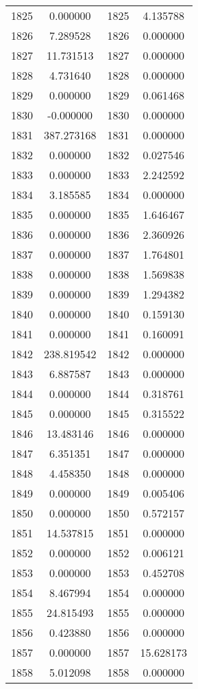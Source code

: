\documentclass[12pt]{article}
\begin{document}
\begin{longtable}{@{}cccc@{}}
1825 & 0.000000 & 1825 & 4.135788 \\
1826 & 7.289528 & 1826 & 0.000000 \\
1827 & 11.731513 & 1827 & 0.000000 \\
1828 & 4.731640 & 1828 & 0.000000 \\
1829 & 0.000000 & 1829 & 0.061468 \\
1830 & -0.000000 & 1830 & 0.000000 \\
1831 & 387.273168 & 1831 & 0.000000 \\
1832 & 0.000000 & 1832 & 0.027546 \\
1833 & 0.000000 & 1833 & 2.242592 \\
1834 & 3.185585 & 1834 & 0.000000 \\
1835 & 0.000000 & 1835 & 1.646467 \\
1836 & 0.000000 & 1836 & 2.360926 \\
1837 & 0.000000 & 1837 & 1.764801 \\
1838 & 0.000000 & 1838 & 1.569838 \\
1839 & 0.000000 & 1839 & 1.294382 \\
1840 & 0.000000 & 1840 & 0.159130 \\
1841 & 0.000000 & 1841 & 0.160091 \\
1842 & 238.819542 & 1842 & 0.000000 \\
1843 & 6.887587 & 1843 & 0.000000 \\
1844 & 0.000000 & 1844 & 0.318761 \\
1845 & 0.000000 & 1845 & 0.315522 \\
1846 & 13.483146 & 1846 & 0.000000 \\
1847 & 6.351351 & 1847 & 0.000000 \\
1848 & 4.458350 & 1848 & 0.000000 \\
1849 & 0.000000 & 1849 & 0.005406 \\
1850 & 0.000000 & 1850 & 0.572157 \\
1851 & 14.537815 & 1851 & 0.000000 \\
1852 & 0.000000 & 1852 & 0.006121 \\
1853 & 0.000000 & 1853 & 0.452708 \\
1854 & 8.467994 & 1854 & 0.000000 \\
1855 & 24.815493 & 1855 & 0.000000 \\
1856 & 0.423880 & 1856 & 0.000000 \\
1857 & 0.000000 & 1857 & 15.628173 \\
1858 & 5.012098 & 1858 & 0.000000 \\

\end{longtable}
\end{document}
